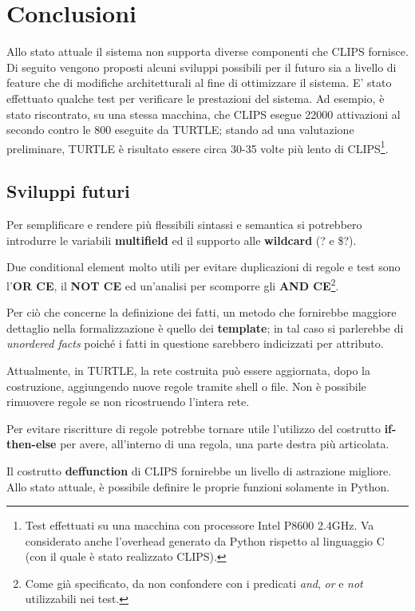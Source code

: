 \chapter{Conclusioni}

Allo stato attuale il sistema non supporta diverse componenti che CLIPS fornisce.
Di seguito vengono proposti alcuni sviluppi possibili per il futuro sia a livello di feature che di modifiche architetturali al fine di ottimizzare il sistema.
E' stato effettuato qualche test per verificare le prestazioni del sistema. Ad esempio, è stato riscontrato, su una stessa macchina, che CLIPS esegue 22000 attivazioni al secondo contro le 800 eseguite da TURTLE; stando ad una valutazione preliminare, TURTLE è risultato essere circa 30-35 volte più lento di CLIPS\footnote{Test effettuati su una macchina con processore Intel P8600 2.4GHz. Va considerato anche l'overhead generato da Python rispetto al linguaggio C (con il quale è stato realizzato CLIPS).}.

\section{Sviluppi futuri}

Per semplificare e rendere più flessibili sintassi e semantica si potrebbero introdurre le variabili \textbf{multifield} ed il supporto alle \textbf{wildcard} (? e \$?).

Due conditional element molto utili per evitare duplicazioni di regole e test sono l'\textbf{OR CE}, il \textbf{NOT CE} ed un'analisi per scomporre gli \textbf{AND CE}\footnote{Come già specificato, da non confondere con i predicati \emph{and}, \emph{or} e \emph{not} utilizzabili nei test.}.

Per ciò che concerne la definizione dei fatti, un metodo che fornirebbe maggiore dettaglio nella formalizzazione è quello dei \textbf{template}; in tal caso si parlerebbe di \emph{unordered facts} poiché i fatti in questione sarebbero indicizzati per attributo.

Attualmente, in TURTLE, la rete costruita può essere aggiornata, dopo la costruzione, aggiungendo nuove regole tramite shell o file. Non è possibile rimuovere regole se non ricostruendo l'intera rete.

Per evitare riscritture di regole potrebbe tornare utile l'utilizzo del costrutto \textbf{if-then-else} per avere, all'interno di una regola, una parte destra più articolata.

Il costrutto \textbf{deffunction} di CLIPS fornirebbe un livello di astrazione migliore. Allo stato attuale, è possibile definire le proprie funzioni solamente in Python.

